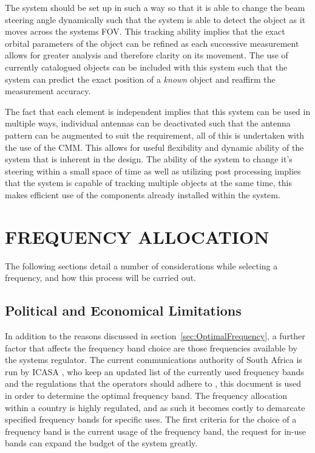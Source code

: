 \documentclass[11pt]{witseiepaper}
\begin{document}
\begin{bibunit}[witseie]
The system should be set up in such a way so that it is able to change the beam steering angle dynamically such that the system is able to detect the object as it moves across the systems FOV. This tracking ability implies that the exact orbital parameters of the object can be refined as each successive measurement allows for greater analysis and therefore clarity on its movement.
The use of currently catalogued objects can be included with this system such that the system can predict the exact position of a \textit{known} object and reaffirm the measurement accuracy.

The fact that each element is independent implies that this system can be used in multiple ways, individual antennas can be deactivated such that the antenna pattern can be augmented to suit the requirement, all of this is undertaken with the use of the CMM. This allows for useful flexibility and dynamic ability of the system that is inherent in the design.
The ability of the system to change it's steering within a small space of time as well as utilizing post processing implies that the system is capable of tracking multiple objects at the same time, this makes efficient use of the components already installed within the system.



\section{FREQUENCY ALLOCATION} \label{sec:FrequencyAllocation}
The following sections detail a number of considerations while selecting a frequency, and how this process will be carried out.

\subsection{Political and Economical Limitations} \label{sec:PoliticalandEconomicalLimitations}
In addition to the reasons discussed in section~\ref{sec:OptimalFrequency}, a further factor that affects the frequency band choice are those frequencies available by the systems regulator. The current communications authority of South Africa is run by ICASA \cite{ICASA}, who keep an updated list of the currently used frequency bands and the regulations that the operators should adhere to \cite{frequencyAllocation}, this document is used in order to determine the optimal frequency band.
The frequency allocation within a country is highly regulated, and as such it becomes costly to demarcate specified frequency bands for specific uses.
The first criteria for the choice of a frequency band is the current usage of the frequency band, the request for in-use bands can expand the budget of the system greatly.


\end{bibunit}
\end{document}
